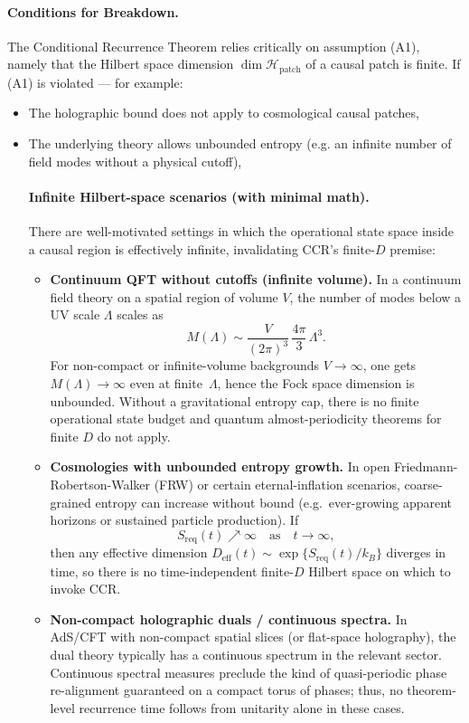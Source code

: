 \documentclass[12pt]{article}
\theoremstyle{remark}
\begin{document}
\paragraph{Conditions for Breakdown.}
The Conditional Recurrence Theorem relies critically on assumption (A1), namely that the Hilbert space dimension
$\dim\mathcal{H}_{\mathrm{patch}}$ of a causal patch is finite.
If (A1) is violated — for example:
\begin{itemize}
    \item The holographic bound does not apply to cosmological causal patches,
    \item The underlying theory allows unbounded entropy (e.g. an infinite number of field modes without a physical cutoff),

    \paragraph{Infinite Hilbert-space scenarios (with minimal math).}
There are well-motivated settings in which the operational state space inside a causal region
is effectively infinite, invalidating CCR's finite-$D$ premise:

\begin{itemize}
    \item \textbf{Continuum QFT without cutoffs (infinite volume).}
    In a continuum field theory on a spatial region of volume $V$, the number of modes below a UV scale $\Lambda$
    scales as
    \[
      M(\Lambda) \sim \frac{V}{(2\pi)^3}\,\frac{4\pi}{3}\,\Lambda^3.
    \]
    For non-compact or infinite-volume backgrounds $V\to\infty$, one gets $M(\Lambda)\to\infty$ even at finite~$\Lambda$,
    hence the Fock space dimension is unbounded. Without a gravitational entropy cap, there is no finite
    operational state budget and quantum almost-periodicity theorems for finite $D$ do not apply.

    \item \textbf{Cosmologies with unbounded entropy growth.}
    In open Friedmann-Robertson-Walker (FRW) or certain eternal-inflation scenarios, coarse-grained entropy can increase without bound
    (e.g.\ ever-growing apparent horizons or sustained particle production). If
    \[
       S_{\text{req}}(t)\nearrow\infty\quad\text{as}\quad t\to\infty,
    \]
    then any effective dimension $D_{\mathrm{eff}}(t)\sim \exp\{S_{\text{req}}(t)/k_B\}$ diverges in time, so there is
    no time-independent finite-$D$ Hilbert space on which to invoke CCR.

    \item \textbf{Non-compact holographic duals / continuous spectra.}
    In AdS/CFT with non-compact spatial slices (or flat-space holography), the dual theory typically has
    a continuous spectrum in the relevant sector. Continuous spectral measures preclude the kind of
    quasi-periodic phase re-alignment guaranteed on a compact torus of phases; thus, no theorem-level
    recurrence time follows from unitarity alone in these cases.
\end{itemize}


\end{itemize}
\end{document}
